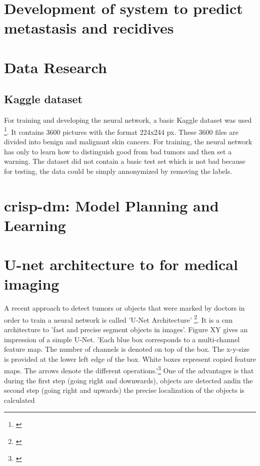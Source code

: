 \section{Development of system to predict metastasis and recidives} 

\section{Data Research}
\subsection{Kaggle dataset}
For training and developing the neural network, a basic Kaggle dataset was used \footnote{\cite{kaggle_dataset}}. It contains 3600 pictures with the format 224x244 px. These 3600 files are divided into benign and malignant skin cancers. 
For training, the neural network has only to learn how to distinguish good from bad tumors and then set a warning. 
The dataset did not contain a basic test set which is not bad because for testing, the data could be simply annonymized by removing the labels.

\section{\ac{crisp-dm}: Model Planning and Learning}

\section{U-net architecture to for medical imaging}
A recent approach to detect tumors or objects that were marked by doctors in order to train a neural network is called 'U-Net Architecture' \footnote{\cite{unet}}. It is a \ac{cnn} architecture to 'fast and precise segment objects in images'.
Figure XY gives an impression of a simple U-Net. 
'Each blue box corresponds to a multi-channel feature map. The number of channels is denoted on top of the box. The x-y-size is provided at the lower left edge of the box. White boxes represent copied feature maps. The arrows denote the different operations.'\footnote{\cite{unet}}
One of the advantages is that during the first step (going right and downwards), objects are detected andin the second step (going right and upwards) the precise localization of the objects is calculated

